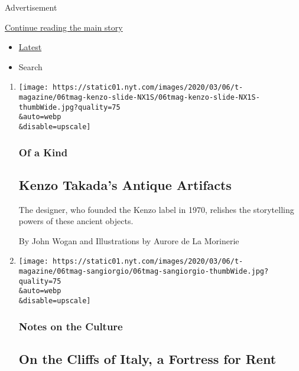 Advertisement

\protect\hyperlink{after-mid1}{Continue reading the main story}

\begin{itemize}
\tightlist
\item
  \protect\hyperlink{stream-panel}{Latest}
\item
  Search
\end{itemize}

\begin{enumerate}
\def\labelenumi{\arabic{enumi}.}
\item
  \href{/2020/03/06/t-magazine/kenzo-takada-antique-artifacts.html}{}

  \texttt{[image: https://static01.nyt.com/images/2020/03/06/t-magazine/06tmag-kenzo-slide-NX1S/06tmag-kenzo-slide-NX1S-thumbWide.jpg?quality=75\\\&auto=webp\\\&disable=upscale]}

  \hypertarget{of-a-kind}{%
  \subsubsection{Of a Kind}\label{of-a-kind}}

  \hypertarget{kenzo-takadas-antique-artifacts}{%
  \subsection{Kenzo Takada's Antique
  Artifacts}\label{kenzo-takadas-antique-artifacts}}

  The designer, who founded the Kenzo label in 1970, relishes the
  storytelling powers of these ancient objects.

  By John Wogan and Illustrations by Aurore de La Morinerie
\item
  \href{/2020/03/06/t-magazine/forte-san-giorgio.html}{}

  \texttt{[image: https://static01.nyt.com/images/2020/03/06/t-magazine/06tmag-sangiorgio/06tmag-sangiorgio-thumbWide.jpg?quality=75\\\&auto=webp\\\&disable=upscale]}

  \hypertarget{notes-on-the-culture-1}{%
  \subsubsection{Notes on the Culture}\label{notes-on-the-culture-1}}

  \hypertarget{on-the-cliffs-of-italy-a-fortress-for-rent}{%
  \subsection{On the Cliffs of Italy, a Fortress for
  Rent}\label{on-the-cliffs-of-italy-a-fortress-for-rent}}


\end{enumerate}
